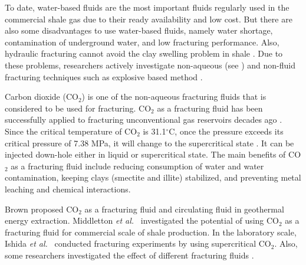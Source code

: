 To date, water-based fluids are the most important fluids  regularly used in the commercial shale gas due to their ready availability and low cost. But there are also some disadvantages to use water-based fluids, namely water shortage, contamination of underground water, and low fracturing performance. Also, hydraulic fracturing cannot avoid the clay swelling problem in shale \cite{middleton2014co2}. Due to these problems, researchers {actively investigate} non-aqueous (see \cite{WANG2016160}) and non-fluid fracturing techniques such as explosive based method \cite{miller1976fracturing}.

Carbon dioxide (CO$_2$) is one of the non-aqueous fracturing fluids that is considered to {be used for} fracturing. CO$_2$ as a fracturing fluid has been successfully applied to fracturing unconventional gas reservoirs decades ago \cite{lillies1982sand}. Since the critical temperature of CO$_2$ is 31.1$^{\circ}$C, once the pressure exceeds its critical pressure of 7.38 MPa, it will change to the supercritical state \cite{suehiro1996critical}. It can be injected down-hole either in liquid or supercritical state. The main benefits of CO$_2$ as a fracturing fluid include reducing consumption of water and water contamination, %
keeping clays (smectite and illite) stabilized, and preventing metal leaching and chemical interactions.

Brown \cite{brown2000hot} proposed CO$_2$ as a fracturing fluid and circulating fluid in geothermal energy extraction. Middletton  \emph{et al.}~\cite{middleton2015shale} investigated
the potential of using CO$_2$ as a fracturing fluid for commercial scale of shale production. %
In the laboratory scale, Ishida \emph{et al.}~\cite{ishida2012acoustic,ishida2016features} conducted fracturing %
experiments by using supercritical CO$_2$. Also, some researchers investigated the effect of different fracturing fluids \cite{wang2018influence,zhou2014fluid}.

